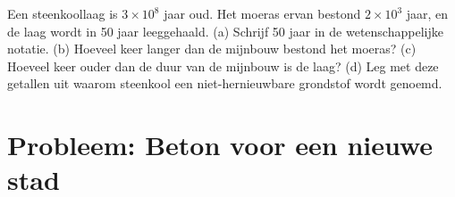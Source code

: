 \begin{exercise}[$\star\star\star$]\label{exo:g9:earth-resources:12}
Een steenkoollaag is $3 \times 10^8$ jaar oud. Het moeras ervan bestond
$2 \times 10^3$ jaar, en de laag wordt in 50 jaar leeggehaald.
(a) Schrijf 50 jaar in de wetenschappelijke notatie. (b) Hoeveel keer
langer dan de mijnbouw bestond het moeras? (c) Hoeveel keer ouder dan de
duur van de mijnbouw is de laag? (d) Leg met deze getallen uit waarom
steenkool een niet-hernieuwbare grondstof wordt genoemd.
\end{exercise}

\section{Probleem: Beton voor een nieuwe stad}

